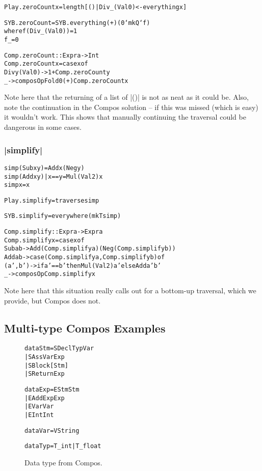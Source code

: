 \documentclass[preprint]{sigplanconf}
\newenvironment{code}{\begin{alltt}\small}{\end{alltt}}
\begin{document}
\begin{code}
Play.zeroCount x = length [() | Div _ (Val 0) <- everything x]

SYB.zeroCount = SYB.everything (+) (0 `mkQ` f)
    where  f (Div _ (Val 0))  = 1
           f _                  = 0

Comp.zeroCount :: Expr a -> Int
Comp.zeroCount x = case x of
    Div y (Val 0) -> 1 + Comp.zeroCount y
    _ -> composOpFold 0 (+) Comp.zeroCount x
\end{code}

Note here that the returning of a list of |()| is not as neat as it could be. Also, note the continuation in the Compos solution -- if this was missed (which is easy) it wouldn't work. This shows that manually continuing the traversal could be dangerous in some cases.

\subsubsection{|simplify|}

\begin{code}
simp (Sub x y)           = Add x (Neg y)
simp (Add x y) | x == y  = Mul (Val 2) x
simp x                   = x

Play.simplify = traverse simp

SYB.simplify = everywhere (mkT simp)

Comp.simplify :: Expr a -> Expr a
Comp.simplify x = case x of
    Sub  a b -> Add (Comp.simplify a) (Neg (Comp.simplify b))
    Add  a b -> case  (Comp.simplify a, Comp.simplify b) of
                      (a',b') -> if a' == b' then Mul (Val 2) a' else Add a' b'
    _ -> composOp Comp.simplify x
\end{code}

Note here that this situation really calls out for a bottom-up traversal, which we provide, but Compos does not.


\subsection{Multi-type Compos Examples}

\begin{figure}
\begin{code}
data Stm  =  SDecl    Typ Var
          |  SAss     Var Exp
          |  SBlock   [Stm]
          |  SReturn  Exp

data Exp  =  EStm  Stm
          |  EAdd  Exp Exp
          |  EVar  Var
          |  EInt  Int

data Var  =  V String

data Typ  =  T_int | T_float
\end{code}
\caption{Data type from Compos.}
\label{fig:compos}
\end{figure}
\end{document}

